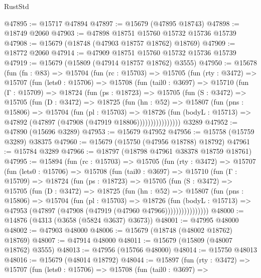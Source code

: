 \begin{lexlean}{RustStd}
\begin{coremodule}
@47895 := @15717 @47894
@47897 := @15679 (@47895 @18743)
@47898 := @18749 @2060
@47903 := @47898 @18751 @15760 @15732 @15736 @15739
@47908 := @15679 (@18748 (@47903 @18757 @18762) @18769)
@47909 := @18772 @2060
@47914 := @47909 @18751 @15760 @15732 @15736 @15739
@47919 := @15679 (@15809 (@47914 @18757 @18762) @3555)
@47950 := @15678
    (fun (fn : @83) =>
    @15704
      (fun (rc : @15703) =>
      @15705
        (fun (rty : @3472) =>
        @15707
          (fun (lets0 : @15706) =>
          @15708
            (fun (tail0 : @3697) =>
            @15710
              (fun (Γ : @15709) =>
              @18724
                (fun (ps : @18723) =>
                @15705
                  (fun (S : @3472) =>
                  @15705
                    (fun (D : @3472) =>
                    @18725
                      (fun (hn : @52) =>
                      @15807
                        (fun (pns : @15806) =>
                        @15704
                          (fun (pl : @15703) =>
                          @18726
                            (fun (bodyL : @15713) =>
                            @47892 (@47897 (@47908 (@47919 @18806))))))))))))))))
    @3289
@47952 := @47890 (@15696 @3289)
@47953 := @15679 @47952
@47956 := @15758 (@15759 @3289) @38375
@47960 := @15679 (@15750 (@47956 @18788) @18792)
@47961 := @15784 @3289
@47966 := @18797 (@18798 @47961 @38378 @18759 @18761)
@47995 := @15894
    (fun (rc : @15703) =>
    @15705
      (fun (rty : @3472) =>
      @15707
        (fun (lets0 : @15706) =>
        @15708
          (fun (tail0 : @3697) =>
          @15710
            (fun (Γ : @15709) =>
            @18724
              (fun (ps : @18723) =>
              @15705
                (fun (S : @3472) =>
                @15705
                  (fun (D : @3472) =>
                  @18725
                    (fun (hn : @52) =>
                    @15807
                      (fun (pns : @15806) =>
                      @15704
                        (fun (pl : @15703) =>
                        @18726
                          (fun (bodyL : @15713) =>
                          @47953 (@47897 (@47908 (@47919 (@47960 @47966))))))))))))))))
@48000 := @14876 (@4313 (@3658 (@5824 @3637) @3673))
@48001 := @47995 @48000
@48002 := @47903 @48000
@48006 := @15679 (@18748 (@48002 @18762) @18769)
@48007 := @47914 @48000
@48011 := @15679 (@15809 (@48007 @18762) @3555)
@48013 := @47956 (@15766 @48000)
@48014 := @15750 @48013
@48016 := @15679 (@48014 @18792)
@48044 := @15897
    (fun (rty : @3472) =>
    @15707
      (fun (lets0 : @15706) =>
      @15708
        (fun (tail0 : @3697) =>

\end{coremodule}
\end{lexlean}
